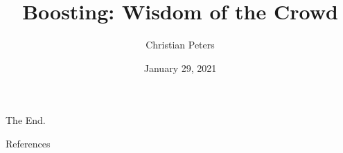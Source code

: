 \documentclass[10pt]{beamer}
\title{Boosting: Wisdom of the Crowd}
\date{January 29, 2021}
\author{Christian Peters}
\begin{document}
\maketitle





	




\begin{frame}[standout]
  The End.
\end{frame}

\appendix

\begin{frame}[allowframebreaks]{References}

  \nocite{SSBD14, FREUND1997119, kv-lbffahf-88, boosting}

  
  

\end{frame}
\end{document}
